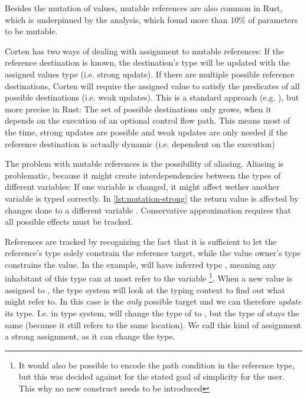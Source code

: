 \documentclass[twoside, english]{sdqthesis}
\theoremstyle{definition}
\begin{document}
Besides the mutation of values, mutable references are also common in Rust, which is underpinned by the analysis, which found more than 10\% of parameters to be mutable.

Corten has two ways of dealing with assignment to mutable references: If the reference destination is known, the destination's type will be updated with the assigned values type (i.e. strong update). If there are multiple possible reference destinations, Corten will require the assigned value to satisfy the predicates of all possible destinations (i.e. weak updates). This is a standard approach (e.g. \cite{kloos_asynchronous_2015}), but more precise in Rust: The set of possible destinations only grows, when it depends on the execution of an optional control flow path. This means most of the time, strong updates are possible and weak updates are only needed if the reference destination is actually dynamic (i.e. dependent on the execution) 

The problem with mutable references is the possibility of aliasing. Aliasing is problematic, because it might create interdependencies between the types of different variables: If one variable is changed, it might affect wether another variable is typed correctly. In \cref{lst:mutation-strong} the return value  is affected by changes done to a different variable . Conservative approximation requires that all possible effects must be tracked. 


References are tracked by recognizing the fact that it is sufficient to let the reference's type solely constrain the reference target, while the value owner's type constrains the value.
In the example,  will have inferred type , meaning any inhabitant of this type can at most refer to the variable \footnote{It would also be possible to encode the path condition in the reference type, but this was decided against for the stated goal of simplicity for the user. This why no new construct needs to be introduced}.
When a new value is assigned to , the type system will look at the typing context to find out what  might refer to. In this case  is the \textit{only} possible target und we can therefore \textit{update} its type. I.e. in type system,  will change the type of  to , but the type of  stays the same (because it still refers to the same location). We call this kind of assignment a strong assignment, as it can change the type.
\end{document}
